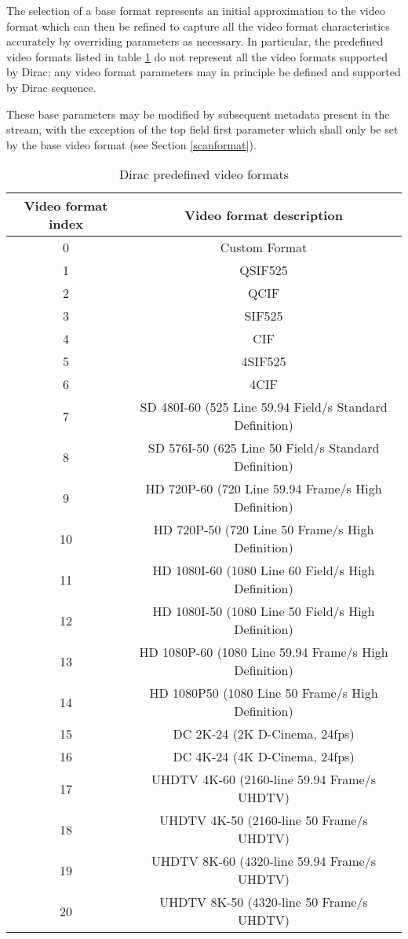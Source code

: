 The selection of a base format represents an initial approximation to the video
format which can then be refined to capture all the video format characteristics
accurately by overriding parameters as necessary. In particular, the predefined
video formats listed in table \ref{table:videoformats} do not represent all the 
video formats supported by Dirac; any video format parameters may in principle be
defined and supported by Dirac sequence.

These base parameters may be modified by subsequent metadata present in the stream, 
with the exception of the top field first parameter which shall only be set 
by the base video format (see Section \ref{scanformat}).

\begin{table}[!ht]
\centering
\begin{tabular}{|c|c|}
\hline
\rowcolor[gray]{0.75}Video format index	& Video format description \\
\hline
0	& Custom Format\\
\hline
1	&	QSIF525\\
\hline
2	&	QCIF\\
\hline
3	&	SIF525\\
\hline
4	&	CIF\\
\hline
5	&	4SIF525\\
\hline
6	&	4CIF\\
\hline
7	&	SD 480I-60 (525 Line 59.94 Field/s Standard Definition)\\
\hline
8	&	SD 576I-50 (625 Line 50 Field/s Standard Definition)\\
\hline
9	&	HD 720P-60 (720 Line 59.94 Frame/s High Definition)\\
\hline
10 &	HD 720P-50 (720 Line 50 Frame/s High Definition)\\
\hline
11 &	HD 1080I-60 (1080 Line 60 Field/s High Definition)\\
\hline
12	&	HD 1080I-50 (1080 Line 50 Field/s High Definition)\\
\hline
13	&	HD 1080P-60 (1080 Line 59.94 Frame/s High Definition)\\
\hline
14	&	HD 1080P50 (1080 Line 50 Frame/s High Definition)\\
\hline
15	&	DC 2K-24 (2K D-Cinema, 24fps)\\
\hline
16	&	DC 4K-24 (4K D-Cinema, 24fps)\\
\hline
17	&	UHDTV 4K-60 (2160-line 59.94 Frame/s UHDTV)\\
\hline
18	&	UHDTV 4K-50 (2160-line 50 Frame/s UHDTV)\\
\hline
19	&	UHDTV 8K-60 (4320-line 59.94 Frame/s UHDTV)\\
\hline
20	&	UHDTV 8K-50 (4320-line 50 Frame/s UHDTV)\\
\hline
\end{tabular}
\caption{Dirac predefined video formats}
\label{table:videoformats}
\end{table}

